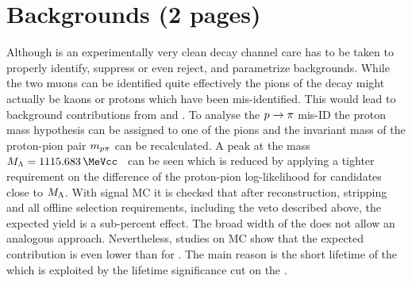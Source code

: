 
\section{Backgrounds (2 pages)}
\label{sec:bd2jpsiks:backgrounds}

Although \BdToJPsiKS is an experimentally very clean decay channel care has to
be taken to properly identify, suppress or even reject, and parametrize
backgrounds. While the two muons can be identified quite effectively the pions
of the \KS decay might actually be kaons or protons which have been
mis-identified. This would lead to background contributions from \BdToJPsiKst
and \LbToJPsiL. To analyse the ${p} \rightarrow {\ensuremath{\pi}}$ mis-ID the proton mass
hypothesis can be assigned to one of the pions and the invariant mass of the
proton-pion pair $m_{{p}{\pi}}$ can be recalculated. A peak at the \Lz
mass $M_{\Lz} = \SI{1115.683}{\MeVcc}$~\cite{PDG2014} can be seen which is
reduced by applying a tighter requirement on the difference of the proton-pion
log-likelihood for candidates close to $M_{{\Lambda}}$. With \LbToJPsiL signal MC it
is checked that after reconstruction, stripping and all offline selection
requirements, including the veto described above, the expected yield is a
sub-percent effect. The broad width of the \Kstarz does not allow an analogous
approach. Nevertheless, studies on \BdToJPsiKst MC show that the expected
contribution is even lower than for \LbToJPsiL. The main reason is the short
lifetime of the \Kstarz which is exploited by the lifetime significance cut on
the \KS.
